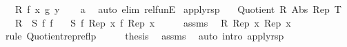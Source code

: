 \begin{isabellebody}
\ \ \ {\isachardoublequoteopen}R{}\ {\isacharparenleft}{\kern0pt}f\ x{\isacharparenright}{\kern0pt}\ {\isacharparenleft}{\kern0pt}g\ y{\isacharparenright}{\kern0pt}{\isachardoublequoteclose}\isanewline
%
\isadelimproof
\ \ %
\endisadelimproof
%
\isatagproof
{}\isamarkupfalse%
\ a\ \isamarkupfalse%
\ {\isacharparenleft}{\kern0pt}auto\ elim{\isacharcolon}{\kern0pt}\ rel{\isacharunderscore}{\kern0pt}funE{\isacharparenright}{\kern0pt}%
\endisatagproof
{\isafoldproof}%
%
\isadelimproof
\isanewline
%
\endisadelimproof
\isanewline
{}\isamarkupfalse%
\ apply{\isacharunderscore}{\kern0pt}rsp{\isacharprime}{\kern0pt}{\isacharprime}{\kern0pt}{\isacharcolon}{\kern0pt}\isanewline
\ \ \ {\isachardoublequoteopen}Quotient\ R\ Abs\ Rep\ T{\isachardoublequoteclose}\isanewline
\ \ \ {\isachardoublequoteopen}{\isacharparenleft}{\kern0pt}R\ {\isacharequal}{\kern0pt}{\isacharequal}{\kern0pt}{\isacharequal}{\kern0pt}{\isachargreater}{\kern0pt}\ S{\isacharparenright}{\kern0pt}\ f\ f{\isachardoublequoteclose}\isanewline
\ \ \ {\isachardoublequoteopen}S\ {\isacharparenleft}{\kern0pt}f\ {\isacharparenleft}{\kern0pt}Rep\ x{\isacharparenright}{\kern0pt}{\isacharparenright}{\kern0pt}\ {\isacharparenleft}{\kern0pt}f\ {\isacharparenleft}{\kern0pt}Rep\ x{\isacharparenright}{\kern0pt}{\isacharparenright}{\kern0pt}{\isachardoublequoteclose}\isanewline
%
\isadelimproof
%
\endisadelimproof
%
\isatagproof
{}\isamarkupfalse%
\ {\isacharminus}{\kern0pt}\isanewline
\ \ \isamarkupfalse%
\ assms{\isacharparenleft}{\kern0pt}{}{\isacharparenright}{\kern0pt}\ \isamarkupfalse%
\ {\isachardoublequoteopen}R\ {\isacharparenleft}{\kern0pt}Rep\ x{\isacharparenright}{\kern0pt}\ {\isacharparenleft}{\kern0pt}Rep\ x{\isacharparenright}{\kern0pt}{\isachardoublequoteclose}\ \isamarkupfalse%
\ {\isacharparenleft}{\kern0pt}rule\ Quotient{\isacharunderscore}{\kern0pt}rep{\isacharunderscore}{\kern0pt}reflp{\isacharparenright}{\kern0pt}\isanewline
\ \ \isamarkupfalse%
\ \isamarkupfalse%
\ {\isacharquery}{\kern0pt}thesis\ \isamarkupfalse%
\ assms{\isacharparenleft}{\kern0pt}{}{\isacharparenright}{\kern0pt}\ \isamarkupfalse%
\ {\isacharparenleft}{\kern0pt}auto\ intro{\isacharcolon}{\kern0pt}\ apply{\isacharunderscore}{\kern0pt}rsp{\isacharprime}{\kern0pt}{\isacharparenright}{\kern0pt}\isanewline
{}\isamarkupfalse%
%
\endisatagproof

\end{isabellebody}
